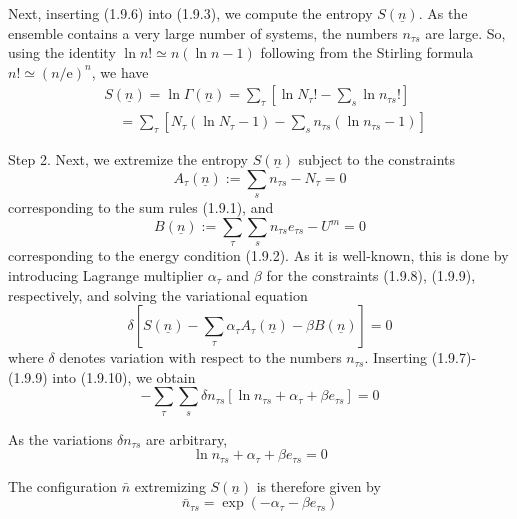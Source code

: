 \documentclass{article}
\begin{document}
Next, inserting (1.9.6) into (1.9.3), we compute the entropy $S(\underline{n})$. As the ensemble contains a very large number of systems, the numbers $n_{\tau s}$ are large. So, using the identity $\ln n!\simeq n(\ln n-1)$ following from the Stirling formula $n!\simeq(n / \mathrm{e})^{n}$, we have
$$
\begin{align*}
& S(\underline{n})= \ln \Gamma(\underline{n})=\sum_{\tau}\left[\ln N_{\tau}!-\sum_{s} \ln n_{\tau s}!\right]  \tag{1.9.7}\\
& \quad=\sum_{\tau}\left[N_{\tau}\left(\ln N_{\tau}-1\right)-\sum_{s} n_{\tau s}\left(\ln n_{\tau s}-1\right)\right]
\end{align*}
$$

Step 2. Next, we extremize the entropy $S(\underline{n})$ subject to the constraints
$$
\begin{equation*}
A_{\tau}(\underline{n}):=\sum_{s} n_{\tau s}-N_{\tau}=0 \tag{1.9.8}
\end{equation*}
$$
corresponding to the sum rules (1.9.1), and
$$
\begin{equation*}
B(\underline{n}):=\sum_{\tau} \sum_{s} n_{\tau s} e_{\tau s}-U^{m}=0 \tag{1.9.9}
\end{equation*}
$$
corresponding to the energy condition (1.9.2). As it is well-known, this is done by introducing Lagrange multiplier $\alpha_{\tau}$ and $\beta$ for the constraints (1.9.8), (1.9.9), respectively,
and solving the variational equation
$$
\begin{equation*}
\delta\left[S(\underline{n})-\sum_{\tau} \alpha_{\tau} A_{\tau}(\underline{n})-\beta B(\underline{n})\right]=0 \tag{1.9.10}
\end{equation*}
$$
where $\delta$ denotes variation with respect to the numbers $n_{\tau s}$. Inserting (1.9.7)-(1.9.9) into (1.9.10), we obtain
$$
\begin{equation*}
-\sum_{\tau} \sum_{s} \delta n_{\tau s}\left[\ln n_{\tau s}+\alpha_{\tau}+\beta e_{\tau s}\right]=0 \tag{1.9.11}
\end{equation*}
$$

As the variations $\delta n_{\tau s}$ are arbitrary,
$$
\begin{equation*}
\ln n_{\tau s}+\alpha_{\tau}+\beta e_{\tau s}=0 \tag{1.9.12}
\end{equation*}
$$

The configuration $\bar{n}$ extremizing $S(\underline{n})$ is therefore given by
$$
\begin{equation*}
\bar{n}_{\tau s}=\exp \left(-\alpha_{\tau}-\beta e_{\tau s}\right) \tag{1.9.13}
\end{equation*}
$$
\end{document}
